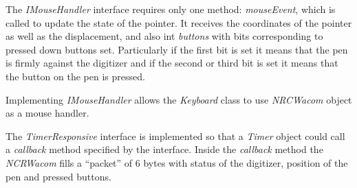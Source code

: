 The \emph{IMouseHandler} interface requires only one method: \emph{mouseEvent},
which is called to update the state of the pointer. It receives the coordinates
of the pointer as well as the displacement, and also int \emph{buttons} with
bits corresponding to pressed down  buttons set. Particularly if the first bit
is set it means that the pen is firmly against the digitizer and if the second
or third bit is set it means that the button on the pen is pressed.

\begin{codeblock}
    
\end{codeblock}


Implementing \emph{IMouseHandler} allows the \emph{Keyboard} class to use
\emph{NRCWacom} object as a mouse handler.

The \emph{TimerResponsive} interface is implemented so that a \emph{Timer}
object could call a \emph{callback} method specified by the interface. Inside
the \emph{callback} method the \emph{NCRWacom} fills a ``packet'' of 6 bytes
with status of the digitizer, position of the pen and pressed buttons.

\begin{codeblock}
    
\end{codeblock}


